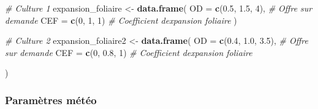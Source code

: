 \documentclass[
]{article}
\newenvironment{Shaded}{\begin{snugshade}}{\end{snugshade}}
\newcommand{\AttributeTok}[1]{\textcolor[rgb]{0.13,0.29,0.53}{#1}}
\newcommand{\CommentTok}[1]{\textcolor[rgb]{0.56,0.35,0.01}{\textit{#1}}}
\newcommand{\DecValTok}[1]{\textcolor[rgb]{0.00,0.00,0.81}{#1}}
\newcommand{\FloatTok}[1]{\textcolor[rgb]{0.00,0.00,0.81}{#1}}
\newcommand{\FunctionTok}[1]{\textcolor[rgb]{0.13,0.29,0.53}{\textbf{#1}}}
\newcommand{\NormalTok}[1]{#1}
\newcommand{\OtherTok}[1]{\textcolor[rgb]{0.56,0.35,0.01}{#1}}
\begin{document}
\begin{Shaded}
\begin{Highlighting}[]
\CommentTok{\# Culture 1}
\NormalTok{expansion\_foliaire }\OtherTok{\textless{}{-}} \FunctionTok{data.frame}\NormalTok{(}
  \AttributeTok{OD  =} \FunctionTok{c}\NormalTok{(}\FloatTok{0.5}\NormalTok{, }\FloatTok{1.5}\NormalTok{, }\DecValTok{4}\NormalTok{), }\CommentTok{\# Offre sur demande}
  \AttributeTok{CEF =} \FunctionTok{c}\NormalTok{(}\DecValTok{0}\NormalTok{,   }\DecValTok{1}\NormalTok{,   }\DecValTok{1}\NormalTok{)  }\CommentTok{\# Coefficient d\textquotesingle{}expansion foliaire}
\NormalTok{)}

\CommentTok{\# Culture 2}
\NormalTok{expansion\_foliaire2 }\OtherTok{\textless{}{-}} \FunctionTok{data.frame}\NormalTok{(}
  \AttributeTok{OD  =} \FunctionTok{c}\NormalTok{(}\FloatTok{0.4}\NormalTok{, }\FloatTok{1.0}\NormalTok{, }\FloatTok{3.5}\NormalTok{), }\CommentTok{\# Offre sur demande}
  \AttributeTok{CEF =} \FunctionTok{c}\NormalTok{(}\DecValTok{0}\NormalTok{,   }\FloatTok{0.8}\NormalTok{, }\DecValTok{1}\NormalTok{)    }\CommentTok{\# Coefficient d\textquotesingle{}expansion foliaire}

\NormalTok{)}
\end{Highlighting}
\end{Shaded}

\subsubsection{Paramètres météo}\label{paramuxe8tres-muxe9tuxe9o}
\end{document}
